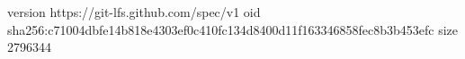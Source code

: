 version https://git-lfs.github.com/spec/v1
oid sha256:c71004dbfe14b818e4303ef0c410fc134d8400d11f163346858fec8b3b453efc
size 2796344
